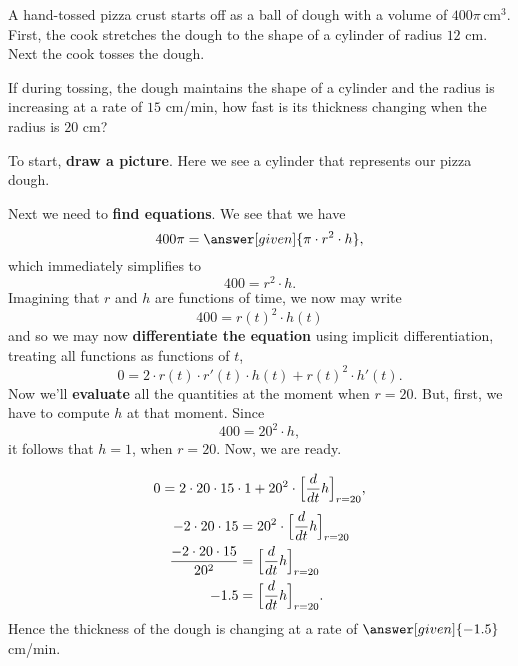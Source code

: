 \documentclass{ximera}
\begin{document}
\begin{example}
A hand-tossed pizza crust starts off as a ball of dough with a volume
of $400\pi\, \text{cm}^3$. First, the cook stretches the dough to the
shape of a cylinder of radius $12$ cm. Next the cook tosses the
dough.

If during tossing, the dough maintains the shape of a cylinder and the
radius is increasing at a rate of $15$ cm/min, how fast is its
thickness changing when the radius is $20$ cm?
\begin{explanation}
  To start, \textbf{draw a picture}. Here we see a cylinder that
  represents our pizza dough.
  \begin{image}
  \end{image}
  Next we need to \textbf{find equations}. We see that we have
  \[
  400\pi = \answer[given]{\pi \cdot r^2 \cdot h},
  \]
  which immediately simplifies to
  \[
  400 = r^2 \cdot h.
  \]
  Imagining that $r$ and $h$ are functions of time, we now may write
  \[
  400 = r(t)^2 \cdot h(t)
  \]
  and so we may now \textbf{differentiate the equation} using implicit
  differentiation, treating all functions as functions of $t$,
  \[
  0 = 2\cdot r(t) \cdot r'(t) \cdot h(t) + r(t)^2 \cdot h'(t).
  \]
  Now we'll \textbf{evaluate} all  the quantities at the moment when $r=20$. 
  But, first, we have to compute $h$ at that moment. Since
  \[
 400 = 20^2 \cdot h, 
  \] it follows that $h=1$, when $r=20$. Now, we are ready.
  
 \[
 0 = 2\cdot 20 \cdot 15 \cdot 1 + 20^2 \cdot \Bigl[\frac{d}{dt}h\Bigr]_{r=20},
  \]
  \begin{align*}
    -2\cdot 20 \cdot 15  &= 20^2 \cdot  \Bigl[\frac{d}{dt}h\Bigr]_{r=20}\\
    \frac{-2\cdot 20 \cdot 15}{20^2}  &=  \Bigl[\frac{d}{dt}h\Bigr]_{r=20}\\
    -1.5  &=  \Bigl[\frac{d}{dt}h\Bigr]_{r=20}.
  \end{align*}
  Hence the thickness of the dough is changing at a rate of $\answer[given]{-1.5}$
  cm/min.
\end{explanation}
\end{example}
\end{document}
